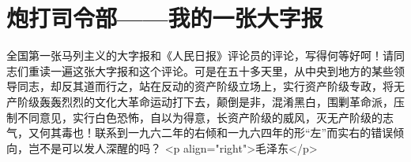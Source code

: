 \section[炮打司令部——我的一张大字报（一九六六年八月五日）]{炮打司令部——我的一张大字报}


全国第一张马列主义的大字报和《人民日报》评论员的评论，写得何等好呵！请同志们重读一遍这张大字报和这个评论。可是在五十多天里，从中央到地方的某些领导同志，却反其道而行之，站在反动的资产阶级立场上，实行资产阶级专政，将无产阶级轰轰烈烈的文化大革命运动打下去，颠倒是非，混淆黑白，围剿革命派，压制不同意见，实行白色恐怖，自以为得意，长资产阶级的威风，灭无产阶级的志气，又何其毒也！联系到一九六二年的右倾和一九六四年的形“左”而实右的错误倾向，岂不是可以发人深醒的吗？
<p align="right">毛泽东</p>


